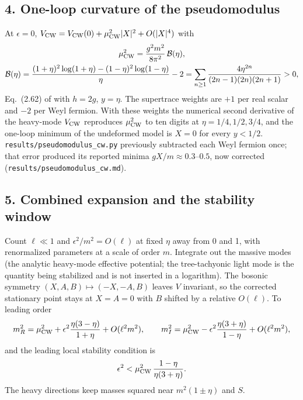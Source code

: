 \documentclass[11pt]{article}
\begin{document}
\subsection*{4. One-loop curvature of the pseudomodulus}

At $\epsilon=0$, $V_{\rm CW}=V_{\rm CW}(0)+\mu_{\rm CW}^2|X|^2+O(|X|^4)$ with
\begin{gather}
\mu^2_{\rm CW}=\frac{g^2m^2}{8\pi^2}\,\mathcal B(\eta),\\
\mathcal B(\eta)=\frac{(1+\eta)^2\log(1+\eta)-(1-\eta)^2\log(1-\eta)}{\eta}-2
=\sum_{n\ge1}\frac{4\eta^{2n}}{(2n-1)(2n)(2n+1)}>0 ,
\end{gather}
Eq.~(2.62) of \cite{IS2007} with $h=2g$, $y=\eta$. The supertrace weights
are $+1$ per real scalar and $-2$ per Weyl fermion. With these weights the
numerical second derivative of the heavy-mode $V_{\rm CW}$ reproduces
$\mu^2_{\rm CW}$ to ten digits at $\eta=1/4,1/2,3/4$, and the one-loop
minimum of the undeformed model is $X=0$ for every $y<1/2$.
\texttt{results/pseudomodulus\_cw.py} previously subtracted each Weyl
fermion once; that error produced its reported minima
$gX/m\approx0.3$--$0.5$, now corrected (\texttt{results/pseudomodulus\_cw.md}).

\subsection*{5. Combined expansion and the stability window}

Count $\ell\ll1$ and $\epsilon^2/m^2=O(\ell)$ at fixed $\eta$ away from
0 and 1, with renormalized parameters at a scale of order $m$. Integrate out
the massive modes (the analytic heavy-mode effective potential; the
tree-tachyonic light mode is the quantity being stabilized and is not
inserted in a logarithm). The bosonic symmetry
$(X,A,B)\mapsto(-X,-A,B)$ leaves $V$ invariant, so the corrected
stationary point stays at $X=A=0$ with $B$ shifted by a relative $O(\ell)$.
To leading order
\begin{equation}
m_R^2=\mu^2_{\rm CW}+\epsilon^2\frac{\eta(3-\eta)}{1+\eta}+O(\ell^2m^2),\qquad
m_I^2=\mu^2_{\rm CW}-\epsilon^2\frac{\eta(3+\eta)}{1-\eta}+O(\ell^2m^2),
\end{equation}
and the leading local stability condition is
\begin{equation}
\epsilon^2<\mu^2_{\rm CW}\,\frac{1-\eta}{\eta(3+\eta)} .
\end{equation}
The heavy directions keep masses squared near $m^2(1\pm\eta)$ and $S$.
\end{document}
